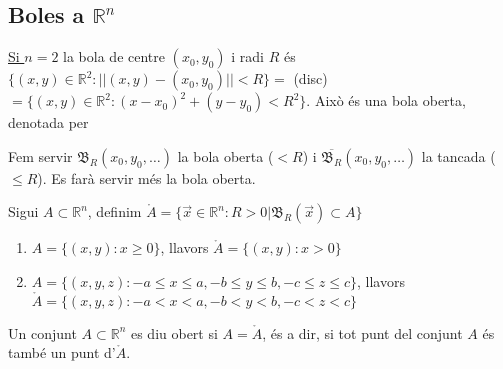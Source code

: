 \documentclass[../main.tex]{subfiles}
\begin{document}
    \subsection{Boles a \texorpdfstring{$\mathbb{R}^n$}{Diverses dimensions}}
    \underline{Si $n=2$} la bola de centre $(x_0, y_0)$ i radi $R$ és $\{(x,y) \in \mathbb{R}^2: ||(x,y)-(x_0, y_0)|| < R\} =$
    (disc) $= \{(x,y)\in \mathbb{R}^2: (x-x_0)^2+(y-y_0)<R^2\}$. Això és una bola oberta, denotada per
    \begin{notacio}
        Fem servir $\mathfrak{B}_R(x_0, y_0, \dots)$ la bola oberta ($< R$) i $\overline{\mathfrak{B}_R}(x_0, y_0, \dots)$
        la tancada ($\leq R$). Es farà servir més la bola oberta.
    \end{notacio}
    \begin{definicio}
        Sigui $A \subset \mathbb{R}^n$, definim $\mathring{A} = \{\vec{x} \in \mathbb{R}^n : R > 0 | \mathfrak{B}_R(\vec{x}) \subset A\}$
    \end{definicio}
    \begin{exemple}
        \begin{enumerate}
            \item $A = \{(x,y):x \geq 0\}$, llavors $\mathring{A} = \{(x,y):x > 0\}$
            \item $A = \{(x,y,z):-a \leq x \leq a, -b \leq y \leq b, -c \leq z \leq c\}$, llavors
            $\mathring{A} = \{(x,y,z):-a < x < a, -b < y < b, -c < z < c\}$
        \end{enumerate}
    \end{exemple}
    \begin{definicio}
        Un conjunt $A \subset \mathbb{R}^n$ es diu obert si $A = \mathring{A}$, és a dir, si tot
        punt del conjunt $A$ és també un punt d'$\mathring{A}$.
    \end{definicio}
\end{document}
